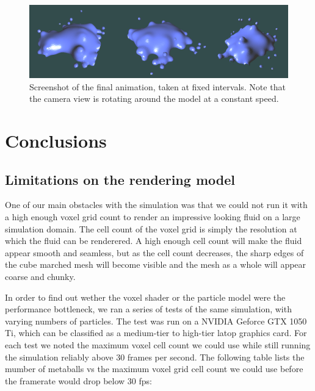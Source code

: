\documentclass{article}
\begin{document}
\begin{multicols}{2}
        \begin{figure}[H]
        	\begin{minipage}[b]{0.5\textwidth}
	            \includegraphics[width=\linewidth]{img/result-animation.png}
				\caption{Screenshot of the final animation, taken at fixed intervals. Note that the camera view is rotating around the model at a constant speed.}
				\label{fig:result-animation}
        	\end{minipage}
        \end{figure}

    \section{Conclusions}
    
        \subsection{Limitations on the rendering model}
        
        One of our main obstacles with the simulation was that we could not run it with a high enough voxel grid count to render an impressive looking fluid on a large simulation domain.
        The cell count of the voxel grid is simply the resolution at which the fluid can be renderered.
        A high enough cell count will make the fluid appear smooth and seamless, but as the cell count decreases, the sharp edges of the cube marched mesh will become visible and the mesh as a whole will appear coarse and chunky.

        In order to find out wether the voxel shader or the particle model were the performance bottleneck, we ran a series of tests of the same simulation, with varying numbers of particles.
        The test was run on a NVIDIA Geforce GTX 1050 Ti, which can be classified as a medium-tier to high-tier latop graphics card.
        For each test we noted the maximum voxel cell count we could use while still running the simulation reliably above 30 frames per second.
        The following table lists the mumber of metaballs vs the maximum voxel grid cell count we could use before the framerate would drop below 30 fps:


\end{multicols}
\end{document}
